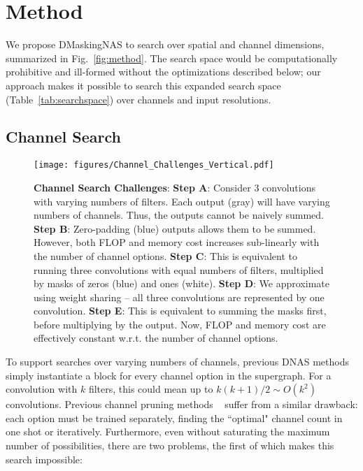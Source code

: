 \documentclass[10pt,twocolumn,letterpaper]{article}
\begin{document}
\section{Method}

We propose DMaskingNAS to search over spatial and channel dimensions, summarized in Fig.~\ref{fig:method}. 
The search space would be computationally prohibitive and ill-formed without the optimizations described below; our approach makes it possible to search this expanded search space (Table~\ref{tab:searchspace}) over channels and input resolutions.

\subsection{Channel Search}\label{sec:channel-search}

\begin{figure}
    \centering
    \texttt{[image: figures/Channel\_Challenges\_Vertical.pdf]}
    \caption{\textbf{Channel Search Challenges}: \textbf{Step A}: Consider 3 convolutions with varying numbers of filters. Each output (gray) will have varying numbers of channels. Thus, the outputs cannot be naively summed. \textbf{Step B}: Zero-padding (blue) outputs allows them to be summed. However, both FLOP and memory cost increases sub-linearly with the number of channel options. \textbf{Step C}: This is equivalent to running three convolutions with equal numbers of filters, multiplied by masks of zeros (blue) and ones (white). \textbf{Step D}: We approximate using weight sharing -- all three convolutions are represented by one convolution. \textbf{Step E}: This is equivalent to summing the masks first, before multiplying by the output. Now, FLOP and memory cost are effectively constant w.r.t. the number of channel options. }
    \label{fig:channel_challenges}
\end{figure}

To support searches over varying numbers of channels, previous DNAS methods simply instantiate a block for every channel option in the supergraph. For a convolution with $k$ filters, this could mean up to $k(k+1)/2\sim O(k^2)$ convolutions. Previous channel pruning methods ~\cite{autoslim} suffer from a similar drawback: each option must be trained separately, finding the ``optimal" channel count in one shot or iteratively.
Furthermore, even without saturating the maximum number of possibilities, there are two problems, the first of which makes this search impossible:
\end{document}

